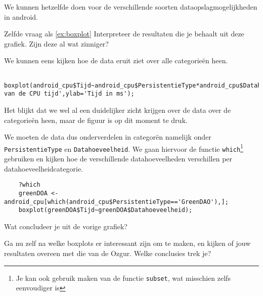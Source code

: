 We kunnen hetzelfde doen voor de verschillende soorten dataopslagmogelijkheden in android.

\begin{exercise}
	Zelfde vraag als \ref{ex:boxplot} Interpreteer de resultaten die je behaalt uit deze grafiek. Zijn deze al wat zinniger?
\end{exercise}

We kunnen eens kijken hoe de data eruit ziet over alle categorie\"en heen.

\begin{lstlisting}
	boxplot(android_cpu$Tijd~android_cpu$PersistentieType*android_cpu$Datahoeveelheid,main='Spreiding van de CPU tijd',ylab='Tijd in ms');
\end{lstlisting}



Het blijkt dat we wel al een duidelijker zicht krijgen over de data over de categorie\"en heen, maar de figuur is op dit moment te druk. 

We moeten de data dus onderverdelen in categor\"en namelijk onder \texttt{PersistentieType} en \texttt{Datahoeveelheid}. We gaan hiervoor de functie \texttt{which}\footnote{Je kan ook gebruik maken van de functie \texttt{subset}, wat misschien zelfs eenvoudiger is} gebruiken en kijken hoe de verschillende datahoeveelheden verschillen per datahoeveelheidcategorie. 

\begin{lstlisting}
	?which
	greenDOA <- android_cpu[which(android_cpu$PersistentieType=='GreenDAO'),];
	boxplot(greenDOA$Tijd~greenDOA$Datahoeveelheid);
\end{lstlisting}

\begin{exercise}
	Wat concludeer je uit de vorige grafiek?
\end{exercise}

\begin{exercise}
	Ga nu zelf na welke boxplots er interessant zijn om te maken, en kijken of jouw resultaten overeen met die van de Ozgur. Welke conclusies trek je?
\end{exercise}



